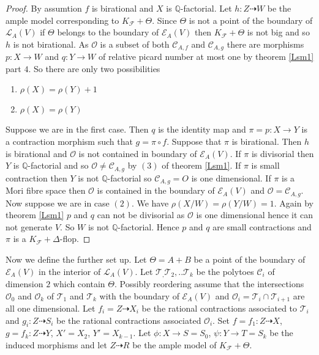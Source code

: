 \documentclass[12pt]{amsart}%
\theoremstyle{plain}
\theoremstyle{remark}
\theoremstyle{definition}
\newcommand{\<}{\leq}
\newcommand{\mbQ}{\mathbb{Q}}
\theoremstyle{definition}
\theoremstyle{definition}
\numberwithin{equation}{section}
\theoremstyle{remark}
\begin{document}
\begin{proof}
    By assumtion $f$ is birational and $X$ is $\mbQ$-factorial. Let $h:Z\dashrightarrow W$ be the ample model corresponding to $K_{\mathcal{F}}+\Theta$. Since $\Theta$ is not a point of the boundary of $\mathcal{L}_A(V)$ if $\Theta$ belongs to the boundary of $\mathcal{E}_A(V)$ then $K_{\mathcal{F}}+\Theta$ is not big and so $h$ is not birational. As $\mathcal{O}$ is a subset of both $\mathcal{C}_{A,f}$ and $\mathcal{C}_{A,g}$ there are morphisms $p:X\rightarrow W$ and $q:Y\rightarrow W$ of relative picard number at most one by theorem \ref{Lsm1} part $4$. So there are only two possibilities
    \begin{enumerate}
        \item $\rho(X)=\rho(Y)+1$
        \item $\rho(X)=\rho(Y)$
    \end{enumerate}
    Suppose we are in the first case. Then $q$ is the identity map and $\pi=p:X\rightarrow Y$ is a contraction morphism such that $g=\pi\circ f$. Suppose that $\pi$ is birational. Then $h$ is birational and $\mathcal{O}$ is not contained in boundary of $\mathcal{E}_A(V)$. If $\pi$ is divisorial then $Y$ is $\mbQ$-factorial and so $\mathcal{O}\neq \mathcal{C}_{A,g}$ by $(3)$ of theorem \ref{Lsm1}. If $\pi$ is small contraction then $Y$ is not $\mbQ$-factorial so $\mathcal{C}_{A,g}=O$ is one dimensional. If $\pi$ is a Mori fibre space then $\mathcal{O}$ is contained in the boundary of $\mathcal{E}_A(V)$ and $\mathcal{O}=\mathcal{C}_{A,g}$. \\
    Now suppose we are in case $(2)$. We have $\rho(X/W)=\rho(Y/W)=1$. Again by theorem \ref{Lsm1} $p$ and $q$ can not be divisorial as $\mathcal{O}$ is one dimensional hence it can not generate $V$. So $W$ is not $\mbQ$-factorial. Hence $p$ and $q$ are small contractions and $\pi$ is a $K_{\mathcal{F}}+\Delta$-flop. 
\end{proof}
Now we define the further set up. Let $\Theta=A+B$ be a point of the boundary of $\mathcal{E}_A(V)$ in the interior of $\mathcal{L}_A(V)$. Let $\mathcal{T}_, \mathcal{T}_2,..\mathcal{T}_k$ be the polytoes $\mathcal{C}_i$ of dimension $2$ which contain $\Theta$. Possibly reordering assume that the intersections $\mathcal{O}_0$ and $\mathcal{O}_k$ of $\mathcal{T}_1$ and $\mathcal{T}_k$ with the boundary of $\mathcal{E}_A(V)$ and $\mathcal{O}_i=\mathcal{T}_i\cap \mathcal{T}_{i+1}$ are all one dimensional. Let $f_i=Z\dashrightarrow X_i$ be the rational contractions associated to $\mathcal{T}_i$ and $g_i:Z\dashrightarrow S_i$ be the rational contractions associated $\mathcal{O}_i$. Set $f=f_1:Z\dashrightarrow X$, $g=f_k:Z\dashrightarrow Y$, $X'=X_2$, $Y'=X_{k-1}$. Let $\phi:X\rightarrow S=S_0$, $\psi:Y\rightarrow T=S_k$ be the induced morphisms and let $Z\dashrightarrow R$ be the ample model of $K_{\mathcal{F}}+\Theta$. \\
\end{document}
